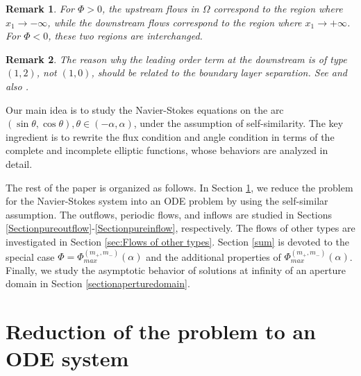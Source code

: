 \documentclass[reqno,12pt]{amsart}
\newtheorem{remark}{Remark}[section]
\begin{document}

\begin{remark}
For $\Phi > 0$, the upstream flows in $\Omega$ correspond to the region where $x_1 \to -\infty$, while the downstream flows correspond to the region where $x_1 \to +\infty$. For $\Phi < 0$, these two regions are interchanged.
  \end{remark}

\begin{remark}
    The reason why the leading order term at the downstream is of type $(1,2)$, not $(1,0)$, should be related to the boundary layer separation. See \cite[p. 4-5]{Abernathy70} and also \cite[Introduction]{Fraenkel62}.
\end{remark}



Our main idea is to study the Navier-Stokes equations on the arc $(\sin \theta, \cos \theta), \theta\in (-\alpha,\alpha)$, under the assumption of self-similarity. The key ingredient is to rewrite the flux condition and angle condition in terms of the complete and incomplete elliptic functions, whose behaviors are analyzed in detail. 


The rest of the paper is organized as follows. 
In Section \ref{sec:2DC}, we reduce the problem for the Navier-Stokes system into an ODE problem by using the self-similar assumption. The outflows, periodic flows, and inflows are studied in Sections \ref{Sectionpureoutflow}-\ref{Sectionpureinflow}, respectively.  The flows of other types are investigated in Section \ref{sec:Flows of other types}. Section \ref{sum} is devoted to the special case $\Phi=\Phi^{(m_+,m_-)}_{max}(\alpha)$ and the additional properties of $\Phi^{(m_+,m_-)}_{max}(\alpha)$.
Finally, we study the asymptotic behavior of solutions at infinity of an aperture domain in Section \ref{sectionaperturedomain}. 

\section{Reduction of the problem to an ODE system} \label{sec:2DC}
    
\end{document}
